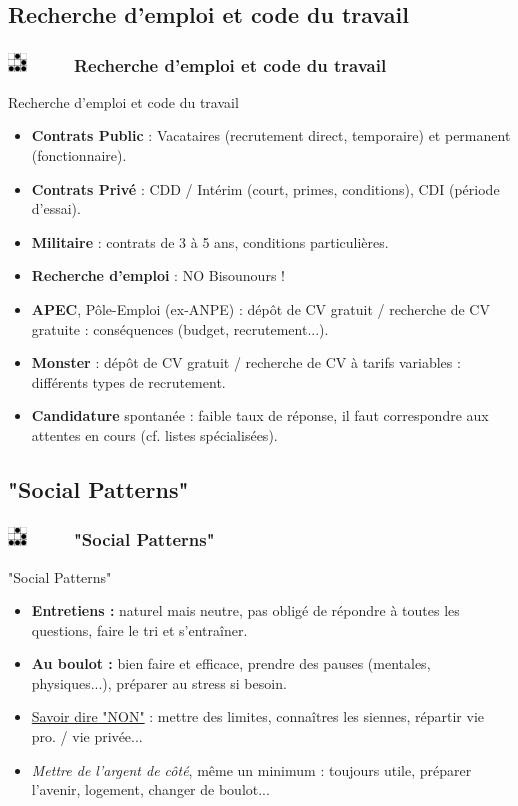 \documentclass[slidetop,11pt]{beamer}
\def\sectionPartIVc{Recherche d'emploi et code du travail}
\def\sectionPartIVd{"Social Patterns"}
\def\moreInFrameTitle{\includegraphics[height=0.5cm]{img/logo_glider.png}~~~~~}
\begin{document}
\subsection{\sectionPartIVc}
\begin{frame}
	\frametitle{\moreInFrameTitle \sectionPartIVc}
	\begin{beamerboxesrounded}	[lower=substructureDE, %
					 upper=block title DE,%
					 shadow=true]%
	       {\sectionPartIVc}
		\begin{itemize}
			\item<1-> \textbf<1-1>{Contrats Public} : Vacataires (recrutement direct, temporaire) et permanent (fonctionnaire). 
			\item<1-> \textbf<1-1>{Contrats Priv{\'e}} : CDD / Int{\'e}rim (court, primes, conditions), CDI (p{\'e}riode d'essai). 
			\item<1-> \textbf<1-1>{Militaire} : contrats de 3 {\`a} 5 ans, conditions particuli{\`e}res. 
			\item<2-> \textbf<2-2>{Recherche d'emploi} : NO Bisounours !
			\item<2-> \textbf<2-2>{APEC}, P{\^o}le-Emploi (ex-ANPE) : d{\'e}p{\^o}t de CV gratuit / recherche de CV gratuite : cons{\'e}quences (budget, recrutement...). 
			\item<2-> \textbf<2-2>{Monster} : d{\'e}p{\^o}t de CV gratuit / recherche de CV {\`a} tarifs variables : diff{\'e}rents types de recrutement. 
			\item <2-> \textbf<2-2>{Candidature} spontan{\'e}e : faible taux de r{\'e}ponse, il faut correspondre aux attentes en cours (cf. listes sp{\'e}cialis{\'e}es). 
		\end{itemize}
	\end{beamerboxesrounded}
\end{frame}

\subsection{\sectionPartIVd}
\begin{frame}
	\frametitle{\moreInFrameTitle \sectionPartIVd}
	\begin{beamerboxesrounded}	[lower=substructureTR, %
					 upper=block title TR,%
					 shadow=true]%
	       {\sectionPartIVd}
		\begin{itemize}
			\item \textbf{Entretiens : } naturel mais neutre, pas oblig{\'e} de r{\'e}pondre {\`a} toutes les questions, faire le tri et s'entra{\^i}ner. 
			\item \textbf{Au boulot : } bien faire et efficace, prendre des pauses (mentales, physiques...), pr{\'e}parer au stress si besoin. 
			\item \underline{Savoir dire "NON"} : mettre des limites, conna{\^i}tres les siennes, r{\'e}partir vie pro. / vie priv{\'e}e...
			\item \emph{Mettre de l'argent de c{\^o}t{\'e}}, m{\^e}me un minimum : toujours utile, pr{\'e}parer l'avenir, logement, changer de boulot...
		\end{itemize}
	\end{beamerboxesrounded}
\end{frame}
\end{document}

